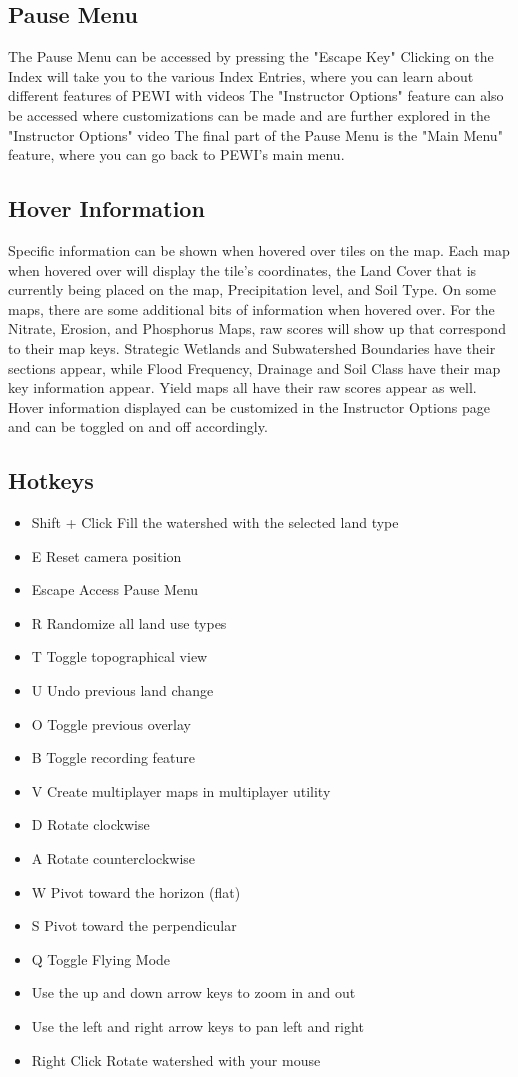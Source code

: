 \documentclass[11pt]{article}
\begin{document}
\begin{itemize}
\subsection{Pause Menu}
The Pause Menu can be accessed by pressing the "Escape Key" Clicking on the Index will take you to the various Index Entries, where you can learn about different features of PEWI with videos The "Instructor Options" feature can also be accessed where customizations can be made and are further explored in the "Instructor Options" video The final part of the Pause Menu is the "Main Menu" feature, where you can go back to PEWI's main menu.

\subsection{Hover Information}
Specific information can be shown when hovered over tiles on the map. Each map when hovered over will display the tile's coordinates, the Land Cover that is currently being placed on the map, Precipitation level, and Soil Type. On some maps, there are some additional bits of information when hovered over. For the Nitrate, Erosion, and Phosphorus Maps, raw scores will show up that correspond to their map keys. Strategic Wetlands and Subwatershed Boundaries have their sections appear, while Flood Frequency, Drainage and Soil Class have their map key information appear. Yield maps all have their raw scores appear as well. Hover information displayed can be customized in the Instructor Options page and can be toggled on and off accordingly.  

\subsection{Hotkeys}
\begin{itemize}
\item Shift + Click	Fill the watershed with the selected land type
\item E	Reset camera position
\item Escape	Access Pause Menu
\item R	Randomize all land use types
\item T	Toggle topographical view
\item U	Undo previous land change
\item O	Toggle previous overlay
\item B	Toggle recording feature
\item V	Create multiplayer maps in multiplayer utility
\item D	Rotate clockwise
\item A	Rotate counterclockwise
\item W	Pivot toward the horizon (flat)
\item S	Pivot toward the perpendicular
\item Q	Toggle Flying Mode
\item Use the up and down arrow keys to zoom in and out
\item Use the left and right arrow keys to pan left and right
\item Right Click	Rotate watershed with your mouse
\end{itemize}


\end{itemize}
\end{document}
